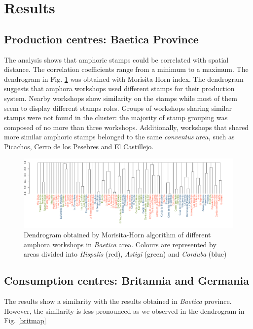 \documentclass[review]{elsarticle}
\newcommand{\memo}[2]{\textcolor{#1}{#2}}
\newcommand{\xavi}[1]{\memo{magenta}{XRC: #1\\}}
\begin{document}
\section{Results}

\subsection{Production centres: Baetica Province}

The analysis shows that amphoric stamps could be correlated with spatial distance. The correlation coefficients range from a minimum to a maximum. The dendrogram in Fig. \ref{dendro} was obtained with Morisita-Horn index. The dendrogram suggests that amphora workshops used different stamps for their production system. Nearby workshops show similarity on the stamps while most of them seem to display different stamps roles. Groups of workshops sharing similar stamps were not found in the cluster: the majority of stamp grouping was composed of no more than three workshops. Additionally, workshops that shared more similar amphoric stamps belonged to the same \textit{conventus} area, such as Picachos, Cerro de los Pesebres and El Castillejo. 

\begin{figure}
	\centering
\includegraphics[width=\linewidth]{figs/dendro}
\caption{Dendrogram obtained by Morisita-Horn algorithm of different amphora workshops in \textit{Baetica} area. Colours are represented by areas divided into \textit{Hispalis} (red), \textit{Astigi} (green) and \textit{Corduba} (blue)}
\label{dendro}
\end{figure} 


\subsection{Consumption centres: Britannia and Germania}

The results show a similarity with the results obtained in \textit{Baetica} province. However, the similarity is less pronounced as we observed in the dendrogram in Fig. \ref{britmap}
\end{document}

